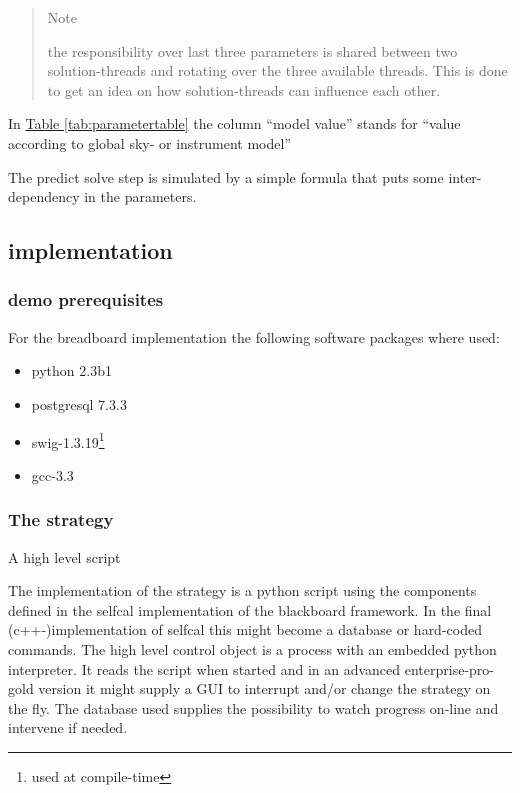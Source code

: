 \documentclass[]{lofar}
\begin{document}
      \begin{verse}{Note}

        the responsibility over last three parameters is shared
        between two solution-threads and rotating over the three
        available threads. This is done to get an idea on how
        solution-threads can influence each other.
     
      \end{verse}

      In \hyperlink{tab:parametertable}{Table \ref{tab:parametertable}} the
      column ``model value'' stands for ``value according to global
      sky- or instrument model''

      The predict solve step is simulated by a simple formula that
      puts some inter-dependency in the parameters.

    \subsection{implementation}
    \label{subsec:implementation}

      \subsubsection{demo prerequisites}
      \label{subsubsec:demo-prerequisites}

        For the breadboard implementation the following software
        packages where used:

        \begin{itemize}

          \item python 2.3b1

          \item postgresql 7.3.3

          \item swig-1.3.19\footnote{used at compile-time\label{compile-time}}

          \item gcc-3.3\footnotemark[\value{footnote}]

        \end{itemize}

      \subsubsection{The strategy}
      \label{subsubsec:stategy}
        A high level script

        The implementation of the strategy is a python script using
        the components defined in the selfcal implementation of the
        blackboard framework. In the final (c++-)implementation of
        selfcal this might become a database or hard-coded commands. The high level control object is a process with an
        embedded python interpreter. It reads the script when started
        and in an advanced enterprise-pro-gold version it might supply
        a GUI to interrupt and/or change the strategy on the fly. The
        database used supplies the possibility to watch progress
        on-line and intervene if needed.
\end{document}
